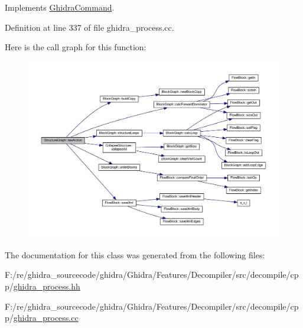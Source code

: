 Implements \mbox{\hyperlink{class_ghidra_command_a7d1a5cfedfd8f1d05161d27627302716}{Ghidra\+Command}}.



Definition at line 337 of file ghidra\+\_\+process.\+cc.

Here is the call graph for this function\+:
\nopagebreak
\begin{figure}[H]
\begin{center}
\leavevmode
\includegraphics[width=350pt]{class_structure_graph_a498c9004314b3845ca36c46f77b43ed6_cgraph}
\end{center}
\end{figure}


The documentation for this class was generated from the following files\+:\begin{DoxyCompactItemize}
\item 
F\+:/re/ghidra\+\_\+sourcecode/ghidra/\+Ghidra/\+Features/\+Decompiler/src/decompile/cpp/\mbox{\hyperlink{ghidra__process_8hh}{ghidra\+\_\+process.\+hh}}\item 
F\+:/re/ghidra\+\_\+sourcecode/ghidra/\+Ghidra/\+Features/\+Decompiler/src/decompile/cpp/\mbox{\hyperlink{ghidra__process_8cc}{ghidra\+\_\+process.\+cc}}\end{DoxyCompactItemize}
